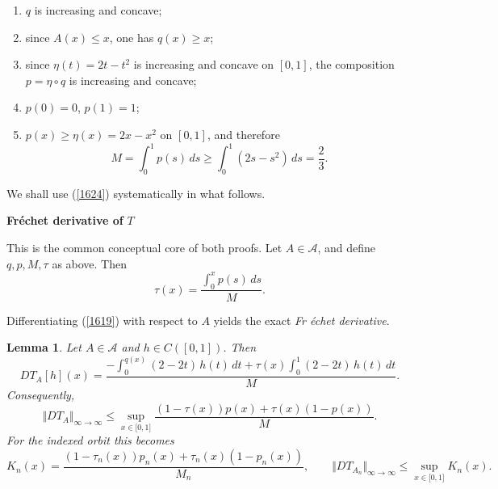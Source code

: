 \documentclass[onecolumn]{article}
\newtheorem{lemma}[theorem]{Lemma}
\begin{document}
\begin{enumerate}
\item $q$ is increasing and concave;

\item since $A(x)\le x$, one has $q(x)\ge x$;

\item since $\eta(t)=2t-t^2$ is increasing and concave on $[0,1]$, the
composition $p=\eta\circ q$ is increasing and concave;

\item $p(0)=0$, $p(1)=1$;

\item $p(x)\geq \eta (x)=2x-x^{2}$ on $[0,1]$, and therefore 
\begin{equation}
M=\int_{0}^{1}p(s)\,ds\geq \int_{0}^{1}(2s-s^{2})\,ds=\frac{2}{3}.
\label{1624}
\end{equation}
\end{enumerate}

We shall use (\ref{1624}) systematically in what follows.

\begin{flushleft}
\textbf{Fr\'{e}chet derivative of }$T$
\end{flushleft}

This is the common conceptual core of both proofs. Let $A\in \mathcal{A}$,
and define $q,p,M,\tau $ as above. Then 
\begin{equation}
\tau (x)=\frac{\int_{0}^{x}p(s)\,ds}{M}.  \label{1625}
\end{equation}

Differentiating (\ref{1619}) with respect to $A$ yields the exact \textit{Fr%
\'{e}chet derivative}.

\begin{lemma}
\label{frechet} Let $A\in \mathcal{A}$ and $h\in C([0,1])$. Then 
\begin{equation}
DT_{A}[h](x)=\frac{-\int_{0}^{q(x)}(2-2t)\,h(t)\,dt+\tau
(x)\int_{0}^{1}(2-2t)\,h(t)\,dt}{M}.  \label{1626}
\end{equation}%
Consequently, 
\begin{equation}
\Vert DT_{A}\Vert _{\infty \rightarrow \infty }\leq \sup_{x\in \lbrack 0,1]}%
\frac{(1-\tau (x))p(x)+\tau (x)(1-p(x))}{M}.  \label{1627}
\end{equation}%
For the indexed orbit this becomes 
\begin{equation}
K_{n}(x)=\frac{(1-\tau _{n}(x))p_{n}(x)+\tau _{n}(x)(1-p_{n}(x))}{M_{n}}%
,\qquad \Vert DT_{A_{n}}\Vert _{\infty \rightarrow \infty }\leq \sup_{x\in
\lbrack 0,1]}K_{n}(x).  \label{1628}
\end{equation}
\end{lemma}
\end{document}
